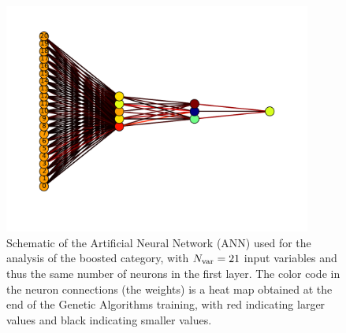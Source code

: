 \begin{figure}[t]
  \begin{center}
      \vspace{-1cm}
  \includegraphics[width=0.90\textwidth]{plots/bst_nnarch_noPU.pdf}
  \vspace{-2cm}
  \caption{\small Schematic of the Artificial
    Neural Network (ANN)
    used for the analysis of the
    boosted
    category, with $N_{\rm var}=21$ input variables and thus
    the same number of neurons
  in the first layer.
  The color code in the neuron connections (the weights) is a heat map obtained
  at the end of the Genetic Algorithms training,
  with red indicating larger values and black indicating smaller values.
}
\label{fig:nnarch}
\end{center}
\end{figure}


